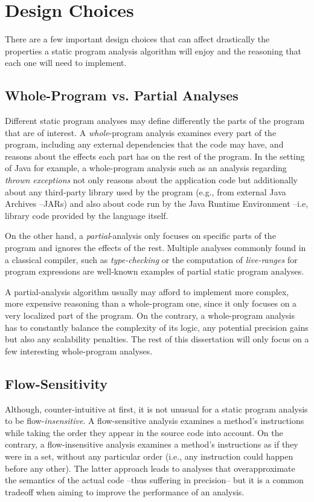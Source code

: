 \section{Design Choices}

There are a few important design choices that can affect drastically the properties a static program analysis algorithm will enjoy and the reasoning that each one will need to implement.

\subsection{Whole-Program vs. Partial Analyses}

Different static program analyses may define differently the parts of the program that are of interest. A \emph{whole}-program analysis examines every part of the program, including any external dependencies that the code may have, and reasons about the effects each part has on the rest of the program. In the setting of Java for example, a whole-program analysis such as an analysis regarding \emph{thrown exceptions} not only reasons about the application code but additionally about any third-party library used by the program (e.g., from external Java Archives --JARs) and also about code run by the Java Runtime Environment --i.e, library code provided by the language itself.

On the other hand, a \emph{partial}-analysis only focuses on specific parts of the program and ignores the effects of the rest. Multiple analyses commonly found in a classical compiler, such as \emph{type-checking} or the computation of \emph{live-ranges} for program expressions are well-known examples of partial static program analyses.

A partial-analysis algorithm usually may afford to implement more complex, more expensive reasoning than a whole-program one, since it only focuses on a very localized part of the program. On the contrary, a whole-program analysis has to constantly balance the complexity of its logic,  any potential precision gains but also any scalability penalties. The rest of this dissertation will only focus on a few interesting whole-program analyses.

\subsection{Flow-Sensitivity} \label{flowSensitivity}

Although, counter-intuitive at first, it is not unusual for a static program analysis to be flow-\emph{insensitive}. A flow-sensitive analysis examines a method's instructions while taking the order they appear in the source code into account. On the contrary, a flow-insensitive analysis examines a method's instructions as if they were in a set, without any particular order (i.e., any instruction could happen before any other). The latter approach leads to analyses that overapproximate the semantics of the actual code --thus suffering in precision-- but it is a common tradeoff when aiming to improve the performance of an analysis.

